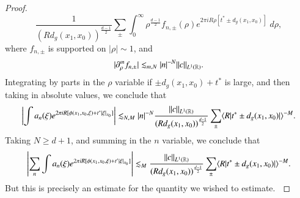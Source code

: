 \begin{proof}
    \[ \frac{1}{\left( R d_g(x_1,x_0) \right)^{\frac{d-1}{2}}} \sum_{\pm} \int_0^\infty \rho^{\frac{d-1}{2}} f_{n,\pm}(\rho) e^{2 \pi i R \rho [ t^* \pm d_g(x_1,x_0)]}\; d\rho, \]
    where $f_{n,\pm}$ is supported on $|\rho| \sim 1$, and
    \[ |\partial_\rho^m f_{n,\pm}| \lesssim_{m,N} |n|^{-N} \| c \|_{L^1(\operatorname{\mathbb{R}})}. \]
    Integrating by parts in the $\rho$ variable if $\pm d_g(x_1,x_0) + t^*$ is large, and then taking in absolute values, we conclude that
    \[ \left| \int a_n(\xi) e^{2 \pi i R [ \phi(x_1,x_0,\xi) + t^* |\xi|_{x_0} ]} \right| \lesssim_{N,M} |n|^{-N} \frac{\| c \|_{L^1(\operatorname{\mathbb{R}})}}{( R d_g(x_1,x_0) )^{\frac{d-1}{2}}} \sum_{\pm} \langle R |t^* \pm d_g(x_1,x_0)| \rangle^{-M}. \]
    Taking $N \geq d + 1$, and summing in the $n$ variable, we conclude that
    \[ \left| \sum_n \int a_n(\xi) e^{2 \pi i R [ \phi(x_1,x_0,\xi) + t' |\xi|_{x_0} ]} \right| \lesssim_M \frac{\| c \|_{L^1(\operatorname{\mathbb{R}})}}{( R d_g(x_1,x_0) )^{\frac{d-1}{2}}} \sum_{\pm} \langle R | t^* \pm d_g(x_1,x_0)| \rangle^{-M}. \]
    But this is precisely an estimate for the quantity we wished to estimate. $\qedhere$





\end{proof}
